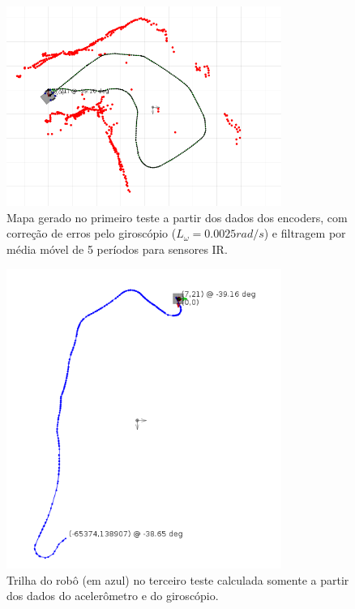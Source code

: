 \begin{figure}[H]
	\centering
	\includegraphics[width=0.8\textwidth]{./figuras/testes/teste3/mapa_encoders_giro_media5.png}
	\caption{Mapa gerado no primeiro teste a partir dos dados dos encoders, com correção de erros pelo giroscópio ($L_\omega = 0.0025 \unit{rad/s}$) e filtragem por média móvel de 5 períodos para sensores IR.}
	\label{fig:teste3_mapa_encoders_giro_media5}
\end{figure}

\begin{figure}[H]
	\centering
	\includegraphics[width=0.8\textwidth]{./figuras/testes/teste3/mapa_acelerometro.png}
	\caption{Trilha do robô (em azul) no terceiro teste calculada somente a partir dos dados do acelerômetro e do giroscópio.}
	\label{fig:teste3_mapa_acelerometro}
\end{figure}

